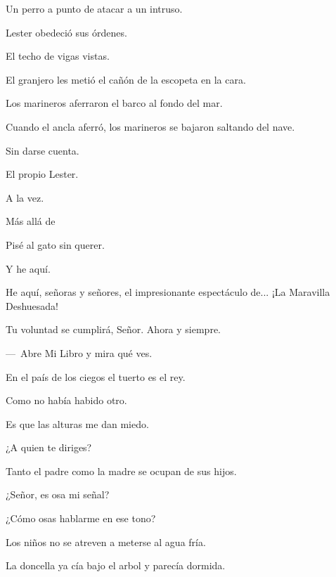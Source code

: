 \sk
Un perro a punto de atacar a un intruso.

\sk
Lester obedeció sus órdenes.

\sk
El techo de vigas vistas.

\sk
El granjero les metió el cañón de la escopeta en la cara. 

\sk
Los marineros aferraron el barco al fondo del mar. 

\sk
Cuando el ancla aferró, los marineros se bajaron saltando del nave. 

\sk
Sin darse cuenta. 

\sk
El propio Lester. 

\sk
A la vez. 

\sk
Más allá de 

\sk
Pisé al gato sin querer. 

\sk
Y he aquí. 

\sk
He aquí, señoras y señores, el impresionante espectáculo de... ¡La Maravilla Deshuesada! 

\sk
Tu voluntad se cumplirá, Señor. Ahora y siempre.

\sk
---~Abre Mi Libro y mira qué ves. 

\sk
En el país de los ciegos el tuerto es el rey.

\sk
Como no había habido otro. 

\sk
Es que las alturas me dan miedo. 

\sk
¿A quien te diriges? 

\sk
Tanto el padre como la madre se ocupan de sus hijos. 

\sk
¿Señor, es osa mi señal? \nb{}

\sk
¿Cómo osas hablarme en ese tono? 

\sk
Los niños no se atreven a meterse al agua fría. 

\sk
La doncella ya cía bajo el arbol y parecía dormida. 

